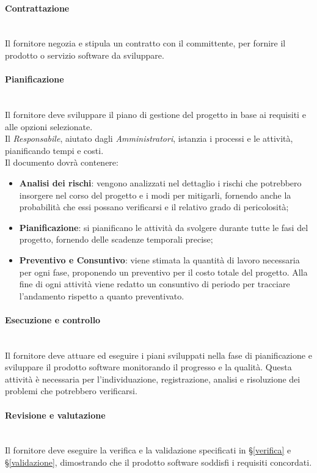 \paragraph{Contrattazione} \-\\
Il fornitore negozia e stipula un contratto con il committente, per fornire il prodotto o servizio software da sviluppare.
\paragraph{Pianificazione} \-\\
Il fornitore deve sviluppare il piano di gestione del progetto in base ai requisiti e alle opzioni selezionate. \\ 
Il \textit{Responsabile}, aiutato dagli \textit{Amministratori}, istanzia i processi e le attività, pianificando tempi e costi. \\
Il documento dovrà contenere:
\begin{itemize}
	\item \textbf{Analisi dei rischi}: vengono analizzati nel dettaglio i rischi che potrebbero insorgere nel corso del progetto e i modi per mitigarli, fornendo anche la probabilità che essi possano verificarsi e il relativo grado di pericolosità; 
	\item \textbf{Pianificazione}: si pianificano le attività da svolgere durante tutte le fasi del progetto, fornendo delle scadenze temporali precise;
	\item \textbf{Preventivo e Consuntivo}:  viene stimata la quantità
	di lavoro necessaria per ogni fase, proponendo un preventivo per il costo totale
	del progetto. Alla fine di ogni attività viene redatto un consuntivo di periodo
	per tracciare l’andamento rispetto a quanto preventivato.
	
\end{itemize}

\paragraph{Esecuzione e controllo} \-\\
Il fornitore deve attuare ed eseguire i piani sviluppati nella fase di 
pianificazione e sviluppare il prodotto software monitorando il progresso e la 
qualità. Questa attività è necessaria per l'individuazione, registrazione, analisi e risoluzione dei problemi che potrebbero verificarsi.

\paragraph{Revisione e valutazione} \-\\
Il fornitore deve eseguire la verifica e la validazione specificati in §\ref{verifica} e §\ref{validazione},  dimostrando che 
il prodotto software soddisfi i requisiti concordati.

